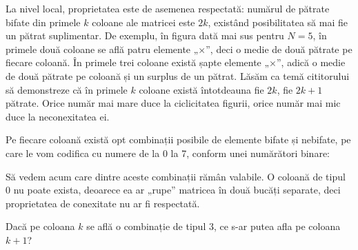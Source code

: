 La nivel local, proprietatea este de asemenea respectată: numărul de pătrate
bifate din primele $k$ coloane ale matricei este $2k$, existând posibilitatea
să mai fie un pătrat suplimentar. De exemplu, în figura dată mai sus pentru
$N=5$, în primele două coloane se află patru elemente „$\times$”, deci o medie
de două pătrate pe fiecare coloană. În primele trei coloane există șapte
elemente „$\times$”, adică o medie de două pătrate pe coloană și un surplus de
un pătrat. Lăsăm ca temă cititorului să demonstreze că în primele $k$ coloane
există întotdeauna fie $2k$, fie $2k+1$ pătrate. Orice număr mai mare duce la
ciclicitatea figurii, orice număr mai mic duce la neconexitatea ei.

Pe fiecare coloană există opt combinații posibile de elemente bifate și
nebifate, pe care le vom codifica cu numere de la 0 la 7, conform unei
numărători binare:


Să vedem acum care dintre aceste combinații rămân valabile. O coloană de tipul
0 nu poate exista, deoarece ea ar „rupe” matricea în două bucăți separate,
deci proprietatea de conexitate nu ar fi respectată.

Dacă pe coloana $k$ se află o combinație de tipul 3, ce s-ar putea afla pe
coloana $k+1$?


